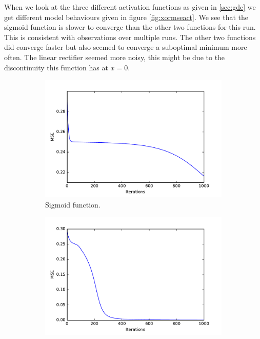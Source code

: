 \documentclass[10 pt, a4paper]{article}
\begin{document}
When we look at the three different activation functions as given in \ref{sec:gde} we get different model behaviours given in figure \ref{fig:xormseact}. We see that the sigmoid function is slower to converge than the other two functions for this run. This is consistent with observations over multiple runs. The other two functions did converge faster but also seemed to converge a suboptimal minimum more often. The linear rectifier seemed more noisy, this might be due to the discontinuity this function has at $x = 0$. 

\begin{figure}[H] 
\begin{subfigure}[b]{0.33\textwidth}
  \centering
    \includegraphics[width=\textwidth]{xor_mse_sig}
  \caption{Sigmoid function.}
\end{subfigure}
\begin{subfigure}[b]{0.33\textwidth} 
  \centering
    \includegraphics[width=\textwidth]{xor_mse_tanh}

\end{subfigure}
\end{figure}
\end{document}
